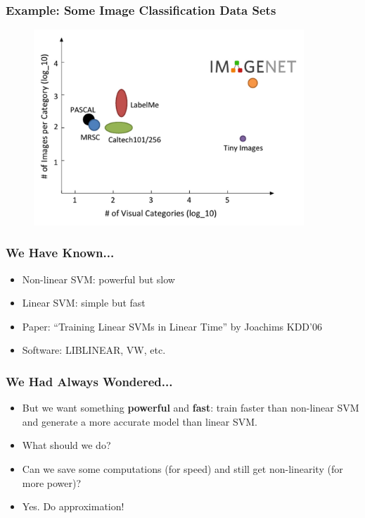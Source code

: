 \documentclass{beamer}
\def\liblinear{{{\sf LIBLINEAR}\xspace}}
\def\vw{{\sf VW}\xspace}
\begin{document}
\begin{frame}
  \frametitle{Example: Some Image Classification Data Sets}
  \begin{figure}
  \includegraphics[width=4in]{tasks_summary.png}\\
  \end{figure}
\end{frame}

\begin{frame}
  \frametitle{We Have Known...}
  \begin{itemize}
    \item Non-linear SVM: powerful but slow 
    \item Linear SVM: simple but fast  
    \item [] Paper: ``Training Linear SVMs in Linear Time'' by Joachims KDD'06
    \item [] Software: \liblinear, \vw, etc.
 \end{itemize}
\end{frame}

\begin{frame}
  \frametitle{We Had Always Wondered...}
  \begin{itemize}
    \item But we want something {\bf powerful} and {\bf fast}: train faster than non-linear SVM and generate a more accurate model than linear SVM.
    \pause
    \item [] What should we do? 
    \pause
    \item Can we save some computations (for speed) and still get non-linearity (for more power)?
    \pause
    \item [] Yes. Do approximation!
  \end{itemize}
\end{frame}
\end{document}
